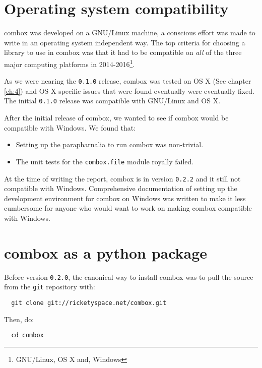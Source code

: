 \section{Operating system compatibility}\label{3-os-compat}

combox was developed on a GNU/Linux machine, a conscious effort was
made to write in an operating system independent way. The top criteria
for choosing a library to use in combox was that it had to be
compatible on \emph{all} of the three major computing platforms in
2014-2016\footnote{GNU/Linux, OS X and, Windows}.

As we were nearing the \verb+0.1.0+ release, combox was tested on OS X
(See chapter \ref{ch:4}) and OS X specific issues that were found
eventually were eventually fixed. The initial \verb+0.1.0+ release was
compatible with GNU/Linux and OS X.

After the initial release of combox, we wanted to see if combox would
be compatible with Windows. We found that:

\begin{itemize}
\item Setting up the parapharnalia to run combox was
  non-trivial\cite{doc:combox-setup-windoze}.
\item The unit tests for the \verb+combox.file+ module royally failed.
\end{itemize}

At the time of writing the report, combox is in version \verb+0.2.2+
and it still not compatible with Windows. Comprehensive documentation
of setting up the development environment for combox on Windows was
written\cite{doc:combox-setup-windoze} to make it less cumbersome for
anyone who would want to work on making combox compatible with
Windows.

\section{combox as a python package}\label{3-pypi}

Before version \verb+0.2.0+, the canonical way to install combox was
to pull the source from the \verb+git+ repository with:

\begin{verbatim}
  git clone git://ricketyspace.net/combox.git
\end{verbatim}

Then, do:

\begin{verbatim}
  cd combox
\end{verbatim}

